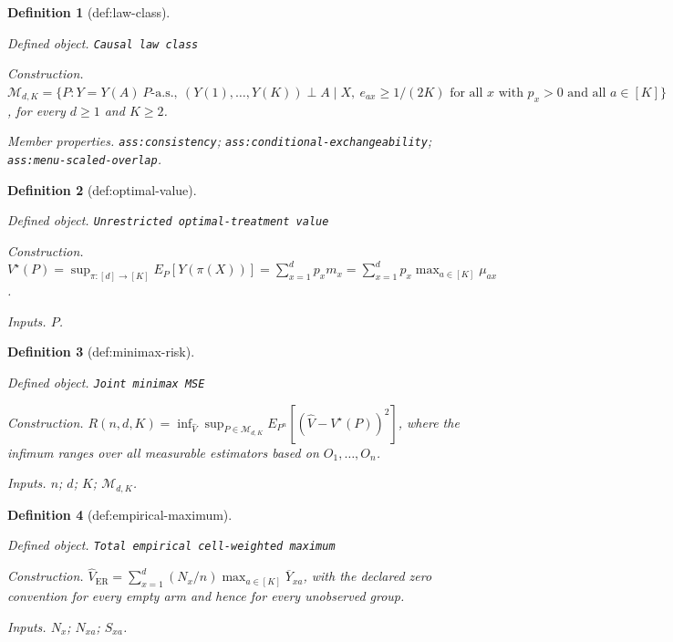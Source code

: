 \documentclass{article}
\newtheorem{definition}{Definition}
\begin{document}
\begin{definition}[def:law-class]\label{def:law-class}
\par\smallskip\noindent\emph{Defined object.} \texttt{Causal law class}
\par\smallskip\noindent\emph{Construction.} \(\mathcal M_{d,K}=\{P: Y=Y(A)\ P\text{-a.s.},\ (Y(1),\ldots,Y(K))\perp A\mid X,\ e_{ax}\ge1/(2K)\text{ for all }x\text{ with }p_x>0\text{ and all }a\in[K]\}\), for every \(d\ge1\) and \(K\ge2\).
\par\smallskip\noindent\emph{Member properties.} \texttt{ass:\allowbreak{}consistency}; \texttt{ass:\allowbreak{}conditional-\allowbreak{}exchangeability}; \texttt{ass:\allowbreak{}menu-\allowbreak{}scaled-\allowbreak{}overlap}.
\end{definition}

\begin{definition}[def:optimal-value]\label{def:optimal-value}
\par\smallskip\noindent\emph{Defined object.} \texttt{Unrestricted optimal-\allowbreak{}treatment value}
\par\smallskip\noindent\emph{Construction.} \(V^\star(P)=\sup_{\pi:[d]\to[K]}E_P[Y(\pi(X))]=\sum_{x=1}^dp_xm_x=\sum_{x=1}^dp_x\max_{a\in[K]}\mu_{ax}\).
\par\smallskip\noindent\emph{Inputs.} \(P\).
\end{definition}

\begin{definition}[def:minimax-risk]\label{def:minimax-risk}
\par\smallskip\noindent\emph{Defined object.} \texttt{Joint minimax MSE}
\par\smallskip\noindent\emph{Construction.} \(R(n,d,K)=\inf_{\widehat V}\sup_{P\in\mathcal M_{d,K}}E_{P^n}[(\widehat V-V^\star(P))^2]\), where the infimum ranges over all measurable estimators based on \(O_1,\ldots,O_n\).
\par\smallskip\noindent\emph{Inputs.} \(n\); \(d\); \(K\); \(\mathcal M_{d,K}\).
\end{definition}

\begin{definition}[def:empirical-maximum]\label{def:empirical-maximum}
\par\smallskip\noindent\emph{Defined object.} \texttt{Total empirical cell-\allowbreak{}weighted maximum}
\par\smallskip\noindent\emph{Construction.} \(\widehat V_{\mathrm{ER}}=\sum_{x=1}^d(N_x/n)\max_{a\in[K]}\overline Y_{xa}\), with the declared zero convention for every empty arm and hence for every unobserved group.
\par\smallskip\noindent\emph{Inputs.} \(N_x\); \(N_{xa}\); \(S_{xa}\).
\end{definition}
\end{document}
